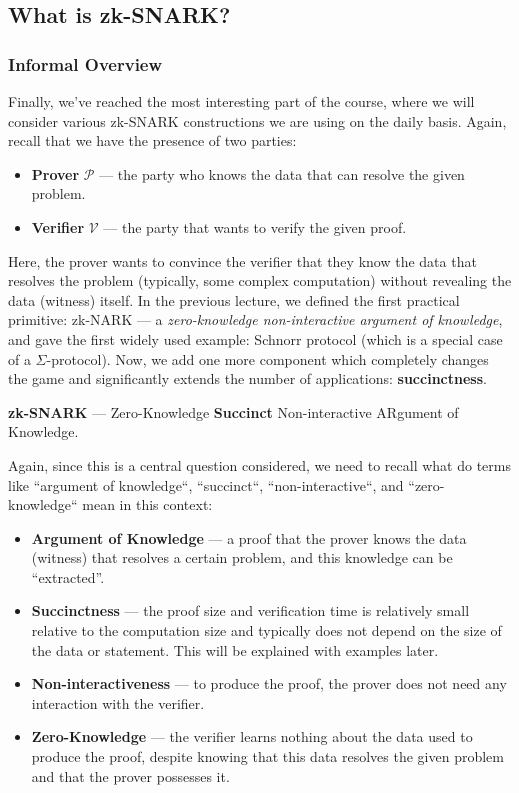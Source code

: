 \documentclass[../lecture-notes.tex]{subfiles}
\begin{document}
\subsection{What is zk-SNARK?}

\subsubsection{Informal Overview}

Finally, we've reached the most interesting part of the course, where we will consider various zk-SNARK constructions we are using on the daily basis. Again, recall that we have the presence of two parties:
\begin{itemize}
    \item \textbf{Prover} $\mathcal{P}$ --- the party who knows the data that can resolve the given problem.
    \item \textbf{Verifier} $\mathcal{V}$ --- the party that wants to verify the given proof.
\end{itemize}

Here, the prover wants to convince the verifier that they know the data that resolves the problem (typically, some complex computation) without revealing the data (witness) itself. In the previous lecture, we defined the first practical primitive: zk-NARK --- a \textit{zero-knowledge non-interactive argument of knowledge}, and gave the first widely used example: Schnorr protocol (which is a special case of a $\Sigma$-protocol). Now, we add one more component which completely changes the game and significantly extends the number of applications: \textbf{succinctness}.

\begin{definition}
    \textbf{zk-SNARK} --- Zero-Knowledge \textbf{Succinct} Non-interactive ARgument of Knowledge.
\end{definition}

Again, since this is a central question considered, we need to recall what do terms like ``argument of knowledge``, ``succinct``, ``non-interactive``, and 
``zero-knowledge`` mean in this context:

\begin{itemize}
    \item \textbf{Argument of Knowledge} --- a proof that the prover knows the data (witness) that resolves a certain
    problem, and this knowledge can be ``extracted''.
    \item \textbf{Succinctness} --- the proof size and verification time is relatively small relative to the computation size and typically does not depend on the size of 
    the data or statement. This will be explained with examples later.
    \item \textbf{Non-interactiveness} --- to produce the proof, the prover does not need any interaction
    with the verifier.
    \item \textbf{Zero-Knowledge} --- the verifier learns nothing about the data used to produce the
    proof, despite knowing that this data resolves the given problem and that the prover possesses it.
\end{itemize}
\end{document}
